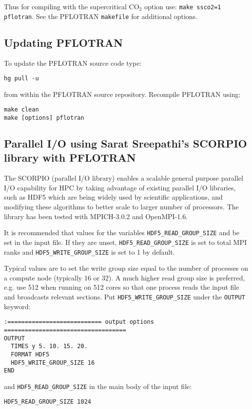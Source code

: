\noindent
Thus for compiling with the supercritical CO$_2$ option use: {\tt make ssco2=1 pflotran}.
See the PFLOTRAN \verb|makefile| for additional options.

\subsection{Updating PFLOTRAN}

To update the PFLOTRAN source code
type: 

{\tt hg pull -u} 

\noindent
from within the PFLOTRAN source repository.
Recompile PFLOTRAN using:

{\tt make clean}\\
\indent
{\tt make [options] pflotran}

\subsection{Parallel I/O using Sarat Sreepathi's SCORPIO library with PFLOTRAN}
\label{parallelio}

The SCORPIO (parallel I/O library) enables a scalable general purpose parallel I/O capability for HPC by taking advantage of existing parallel I/O libraries, such as HDF5 which are being widely used by scientific applications, and modifying these algorithms to better scale to larger number of processors. The library has been tested with MPICH-3.0.2 and OpenMPI-1.6.

\normalsize
It is recommended that values for the variables {\footnotesize\tt HDF5\_READ\_GROUP\_SIZE} and  be set in the input file. 
If they are unset, {\footnotesize\tt HDF5\_READ\_GROUP\_SIZE} is set to total MPI ranks and {\footnotesize\tt HDF5\_WRITE\_GROUP\_SIZE} is set to 1 by default.

Typical values are to set the write group size equal to the number of processes on a compute node (typically 16 or 32). 
A much higher read group size is preferred, e.g. use 512 when running on 512 cores so that one process reads the input file and broadcasts relevant sections.
Put {\footnotesize\tt HDF5\_WRITE\_GROUP\_SIZE} under the {\footnotesize\tt OUTPUT} keyword:
\footnotesize
\begin{Verbatim}
:=========================== output options ===================================
OUTPUT
  TIMES y 5. 10. 15. 20.
  FORMAT HDF5
  HDF5_WRITE_GROUP_SIZE 16
END
\end{Verbatim}
\normalsize
and {\footnotesize\tt HDF5\_READ\_GROUP\_SIZE} in the main body of the input file:
\footnotesize
\begin{Verbatim}
HDF5_READ_GROUP_SIZE 1024
\end{Verbatim}
\normalsize

